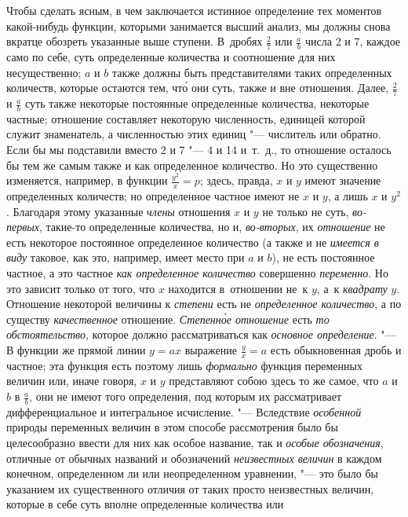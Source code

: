 Чтобы сделать ясным, в чем заключается истинное определение тех моментов
какой-нибудь функции, которыми занимается высший анализ, мы должны снова
вкратце обозреть указанные выше ступени. В~дробях $\frac 2 7$ или $\frac a b$
числа 2 и 7, каждое само по себе, суть определенные количества и соотношение
для них несущественно; $a$ и $b$ также должны быть представителями таких
определенных количеств, которые остаются тем, чт\'{о} они суть, также и вне
отношения. Далее, $\frac 2 7$ и $\frac a b$ суть также некоторые постоянные
определенные количества, некоторые частные; отношение составляет некоторую
численность, единицей которой служит знаменатель, а численностью этих единиц
"--- числитель или обратно. Если бы мы подставили вместо 2 и 7 "--- 4 и 14
и~т.~д., то отношение осталось бы тем же самым также и как определенное
количество. Но это существенно изменяется, например, в функции
$\frac{y^2}x=p$; здесь, правда, $x$ и $y$ имеют значение определенных
количеств; но определенное частное имеют не $x$ и $y$, а лишь $x$ и $y^2$.
Благодаря этому указанные {\em члены} отношения $x$ и $y$ не только не суть,
{\em во-первых}, такие-то определенные количества, но и, {\em во-вторых}, их
{\em отношение} не есть некоторое постоянное определенное количество (а также и
не {\em имеется в виду} таковое, как это, например, имеет место при $a$ и $b$),
не есть постоянное частное, а это частное {\em как определенное количество}
совершенно {\em переменно}. Но это зависит только от того, что $x$ находится
в~отношении не~к $y$, а~к {\em квадрату} $y$. Отношение некоторой величины
к {\em степени} есть не {\em определенное количество}, а по существу
{\em качественное} отношение. {\em Степенн\'{о}е отношение} есть {\em то
обстоятельство}, которое должно рассматриваться как {\em основное определение}.
"--- В функции же прямой линии $y=ax$ выражение $\frac y x=a$ есть обыкновенная
дробь и частное; эта функция есть поэтому лишь {\em формально} функция
переменных величин или, иначе говоря, $x$ и $y$ представляют собою здесь то же
самое, что $a$ и $b$ в $\frac a b$, они не имеют того определения, под которым
их рассматривает дифференциальное и интегральное исчисление. "--- Вследствие
{\em особенной} природы переменных величин в этом способе рассмотрения было бы
целесообразно ввести для них как особое название, так и
{\em особые обозначения}, отличные от обычных названий и обозначений
{\em неизвестных величин} в каждом конечном, определенном ли или неопределенном
уравнении, "--- это было бы указанием их существенного отличия от таких просто
неизвестных величин, которые в себе суть вполне определенные количества или

